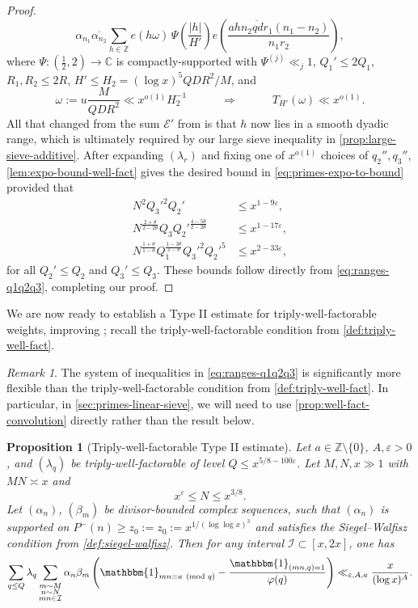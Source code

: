 \documentclass[reqno,11pt]{amsart}
\newtheorem{proposition}[theorem]{Proposition}
\theoremstyle{remark}
\newtheorem*{remark}{Remark}
\numberwithin{equation}{section}
\newcommand{\Z}{\mathbb{Z}}
\newcommand{\C}{\mathbb{C}}
\newcommand{\msE}{\mathscr{E}}
\newcommand{\mI}{\mathcal{I}}
\newcommand{\one}{\mathbbm{1}}
\newcommand{\eps}{\varepsilon}
\renewcommand{\bar}{\overline}
\renewcommand{\pmod}[1]{\ (\textnormal{mod } #1)}
\begin{document}
\begin{proof}
\[    \alpha_{n_1} \bar{\alpha_{n_2}}
    \sum_{h \in \Z} e(h\omega)\,
    \Psi\left(\frac{|h|}{H'}\right) 
    e\left(\frac{ah\bar{n_2qdr_1}(n_1-n_2)}{n_1r_2}\right)
    ,
\]
where $\Psi : (\frac{1}{2}, 2) \to \C$ is compactly-supported with $\Psi^{(j)} \ll_j 1$, $Q_1' \le 2Q_1$, $R_1, R_2 \le 2R$, $H' \le H_2 = (\log x)^5 QDR^2/M$, and 
\[
    \omega := u \frac{M}{QDR^2} \ll x^{o(1)} H_2^{-1}
    \qquad\quad 
    \Rightarrow 
    \qquad\quad
    T_{H'}(\omega) \ll x^{o(1)}.
\]
All that changed from the sum $\msE'$ from \cite[p.\,27]{maynard2025primes2} is that $h$ now lies in a smooth dyadic range, which is ultimately required by our large sieve inequality in \cref{prop:large-sieve-additive}. After expanding $(\lambda_r)$ and fixing one of $x^{o(1)}$ choices of $q_2'', q_3''$, \cref{lem:expo-bound-well-fact} gives the desired bound in \cref{eq:primes-expo-to-bound} provided that
\[
\begin{aligned}
    N^2 {Q_3'}^2 Q_2' &\le x^{1-9\eps}, 
    \\
    N^{\frac{2+\theta}{2-2\theta}} Q_3 {Q_2'}^{\frac{4-5\theta}{2-2\theta}}
    &\le 
    x^{1-17\eps},
    \\ 
    N^{\frac{1+\theta}{1-\theta}} Q_1^{\frac{1-3\theta}{1-\theta}} {Q_3'}^{2} {Q_2'}^{5} &\le 
    x^{2-33\eps},
\end{aligned}
\]
for all $Q_2' \le Q_2$ and $Q_3' \le Q_3$. These bounds follow directly from \cref{eq:ranges-q1q2q3}, completing our proof.
\end{proof}

We are now ready to establish a Type II estimate for triply-well-factorable weights, improving \cite[Proposition 4.1]{maynard2025primes2}; recall the triply-well-factorable condition from \cref{def:triply-well-fact}.


\begin{remark}
The system of inequalities in \cref{eq:ranges-q1q2q3} is significantly more flexible than the triply-well-factorable condition from \cref{def:triply-well-fact}. In particular, in \cref{sec:primes-linear-sieve}, we will need to use \cref{prop:well-fact-convolution} directly rather than the result below.
\end{remark}

\begin{proposition}[Triply-well-factorable Type II estimate] \label{prop:well-fact-type-II}
    Let $a \in \Z \setminus \{0\}$, $A, \eps > 0$, and $(\lambda_q)$ be triply-well-factorable of level $Q \le x^{5/8-100\eps}$. Let $M, N, x \gg 1$ with $MN \asymp x$ and
    \[
        x^\eps \le N \le x^{3/8}.
    \]
    Let $(\alpha_n)$, $(\beta_m)$ be divisor-bounded complex sequences, such that $(\alpha_n)$ is supported on $P^-(n) \ge z_0 := z_0 := x^{1/(\log\log x)^3}$ and satisfies the Siegel--Walfisz condition from \cref{def:siegel-walfisz}. Then for any interval $\mI \subset [x, 2x]$, one has
    \[
        \sum_{q \le Q} \lambda_q 
        \sum_{\substack{m \sim M \\ n \sim N \\ mn \in \mI}} \alpha_n \beta_m \left(\one_{mn \equiv a \pmod{q}} - 
        \frac{\one_{(mn,q) = 1}}{\varphi(q)}
        \right) 
        \ll_{\eps,A,a} \frac{x}{(\log x)^A}.
    \]
\end{proposition}
\end{document}
